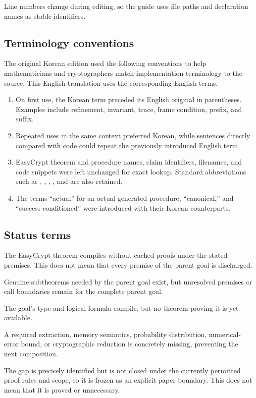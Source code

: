 Line numbers change during editing, so the guide uses file paths and
declaration names as stable identifiers.

\subsection{Terminology conventions}

The original Korean edition used the following conventions to help
mathematicians and cryptographers match implementation terminology to the
source. This English translation uses the corresponding English terms.

\begin{enumerate}
  \item On first use, the Korean term preceded its English original in parentheses.
        Examples include refinement, invariant, trace, frame condition, prefix, and suffix.
  \item Repeated uses in the same context preferred Korean, while sentences
        directly compared with code could repeat the previously introduced English term.
  \item EasyCrypt theorem and procedure names, claim identifiers, filenames,
        and code snippets were left unchanged for exact lookup. Standard
        abbreviations such as , ,
        , , and  are also retained.
  \item The terms ``actual'' for an actual generated procedure, ``canonical,''
        and ``success-conditioned'' were introduced with their Korean counterparts.
\end{enumerate}

\subsection{Status terms}

\begin{description}[style=nextline,leftmargin=2.7cm]
  \item[\statusproved]
    The EasyCrypt theorem compiles without cached proofs under the stated
    premises. This does not mean that every premise of the parent goal is discharged.
  \item[\statuspartial]
    Genuine subtheorems needed by the parent goal exist, but unresolved
    premises or call boundaries remain for the complete parent goal.
  \item[\statusspecified]
    The goal's type and logical formula compile, but no theorem proving it is yet available.
  \item[\statusblocked]
    A required extraction, memory semantics, probability distribution,
    numerical-error bound, or cryptographic reduction is concretely missing,
    preventing the next composition.
  \item[\statusdeferred]
    The gap is precisely identified but is not closed under the currently
    permitted proof rules and scope, so it is frozen as an explicit paper
    boundary. This does not mean that it is proved or unnecessary.
\end{description}

